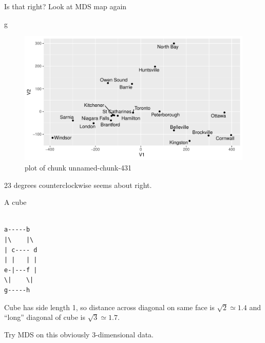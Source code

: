 \documentclass[ignorenonframetext,]{beamer}
\newenvironment{Shaded}{\begin{snugshade}}{\end{snugshade}}
\newcommand{\NormalTok}[1]{#1}
\begin{document}
\begin{frame}[fragile]{Is that right? Look at MDS map again}
\protect\hypertarget{is-that-right-look-at-mds-map-again}{}

\begin{Shaded}
\begin{Highlighting}[]
\NormalTok{g}
\end{Highlighting}
\end{Shaded}

\begin{figure}
\centering
\includegraphics{figure/unnamed-chunk-431-1.pdf}
\caption{plot of chunk unnamed-chunk-431}
\end{figure}

23 degrees counterclockwise seems about right.

\end{frame}

\begin{frame}[fragile]{A cube}
\protect\hypertarget{a-cube}{}

\begin{verbatim}

a-----b
|\    |\
| c---- d
| |   | |
e-|---f |
\|    \|
g-----h
\end{verbatim}

Cube has side length 1, so distance across diagonal on same face is
\(\sqrt{2}\simeq 1.4\) and ``long'' diagonal of cube is
\(\sqrt{3}\simeq 1.7\). \vspace{3ex}

Try MDS on this obviously 3-dimensional data.

\end{frame}
\end{document}

